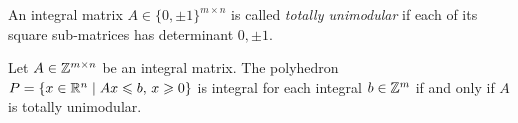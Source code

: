 





\begin{definition}
  \label{def:skip1}  
  An integral matrix $A \in \{0 , \pm 1\}^{m\times n}$ is
  called \emph{totally
  unimodular} if each of its square sub-matrices has
  determinant
  $0,\pm1$.
\end{definition}
   

\begin{theorem}
  \label{po:thr:16}
  Let $A\in \mathbb{Z}^{m\times n}$ be an integral matrix. The polyhedron $P = \{ x
  \in \mathbb{R}^n \mid Ax\leqslant b, \, x\geqslant0\}$ is integral for each integral $b \in
  \mathbb{Z}^m$ if and only if $A$ is totally unimodular. 
\end{theorem}



